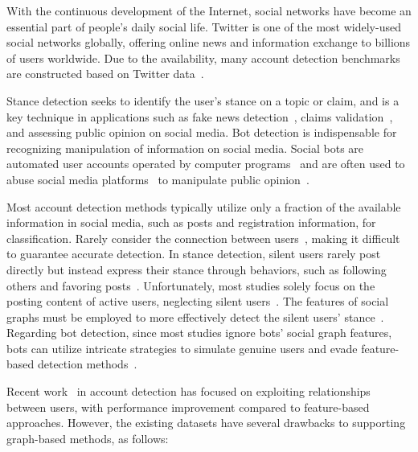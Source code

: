 \documentclass[10pt,twocolumn,letterpaper]{article}
\begin{document}
\label{sec:intro}
With the continuous development of the Internet, social networks have become an essential part of people's daily social life. Twitter is one of the most widely-used social networks globally, offering online news and information exchange to billions of users worldwide. Due to the availability, many account detection benchmarks are constructed based on Twitter data~\cite{Alpher10,Alpher11,Alpher12,Alpher21}.


Stance detection seeks to identify the user's stance on a topic or claim, and is a key technique in applications such as fake news detection~\cite{Alpher25,Alpher27}, claims validation~\cite{Alpher09,Alpher30}, and assessing public opinion on social media. Bot detection is indispensable for recognizing manipulation of information on social media. Social bots are automated user accounts operated by computer programs~\cite{Alpher35} and are often used to abuse social media platforms~\cite{Alpher04,Alpher05} to manipulate public opinion~\cite{Alpher04,Alpher07,Alpher10,Alpher35}.


Most account detection methods typically utilize only a fraction of the available information in social media, such as posts and registration information, for classification. Rarely consider the connection between users~\cite{Alpher08}, making it difficult to guarantee accurate detection. In stance detection, silent users rarely post directly but instead express their stance through behaviors, such as following others and favoring posts~\cite{Alpher08}. Unfortunately, most studies solely focus on the posting content of active users, neglecting silent users~\cite{Alpher08}. The features of social graphs must be employed to more effectively detect the silent users' stance~\cite{Alpher09}. Regarding bot detection, since most studies ignore bots' social graph features, bots can utilize intricate strategies to simulate genuine users and evade feature-based detection methods~\cite{Alpher04}.


Recent work~\cite{Alpher06,Alpher24,Alpher44} in account detection has focused on exploiting relationships between users, with performance improvement compared to feature-based approaches. However, the existing datasets have several drawbacks to supporting graph-based methods, as follows:
\end{document}
